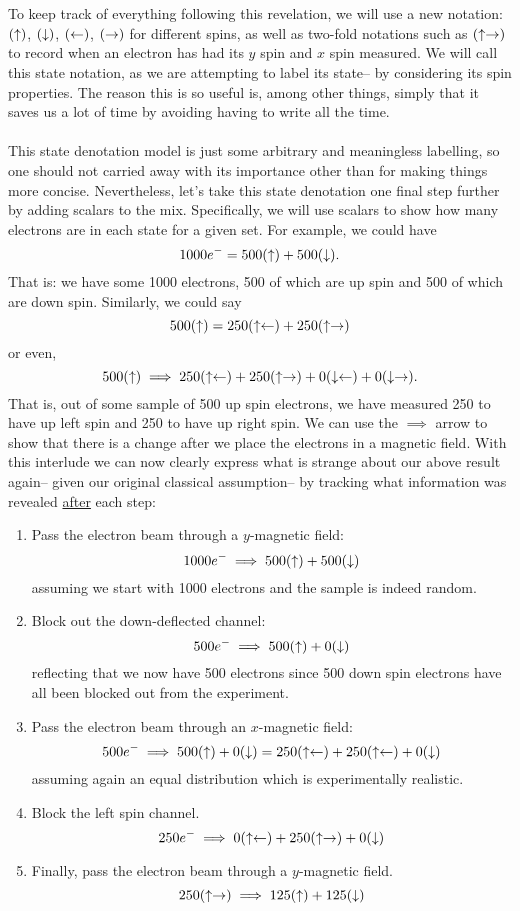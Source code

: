 \\\\
To keep track of everything following this revelation, we will use a new notation: $(\uparrow)$, $(\downarrow)$, $(\leftarrow)$, $(\rightarrow)$ for different spins, as well as two-fold notations such as $(\uparrow\rightarrow)$ to record when an electron has had its $y$ spin and $x$ spin measured. We will call this state notation,
as we are attempting to label its state-- by considering its spin properties. The reason this is so useful is, among other things, simply that it saves us a lot of time by avoiding having to write  all the time.
\\\\
This state denotation model is just some arbitrary and meaningless labelling, so one should not carried away with its importance other than for making things more concise. Nevertheless, let's take this state denotation one final step further by adding scalars to the mix. Specifically, we will use scalars to show how many electrons are in each state for a given set. For example, we could have 
$$
1000e^{-}=500(\uparrow) + 500(\downarrow).
$$
That is: we have some 1000 electrons, 500 of which are up spin and 500 of which are down spin. Similarly, we could say 
$$
500(\uparrow) = 250(\uparrow\leftarrow) + 250(\uparrow\rightarrow)
$$
or even, 
$$
500(\uparrow) \implies 250(\uparrow\leftarrow) + 250(\uparrow\rightarrow) + 0(\downarrow\leftarrow) + 0(\downarrow\rightarrow).
$$
That is, out of some sample of 500 up spin electrons, we have measured 250 to have up left spin and 250 to have up right spin. We can use the $\implies$ arrow to show that there is a change after we place the electrons in a magnetic field. With this interlude we can now clearly express what is strange about our above result again-- given our original classical assumption-- by tracking what information was revealed \underline{after} each step:
\begin{enumerate}
    \item Pass the electron beam through a $y$-magnetic field:
    $$
    1000e^{-} \implies 500(\uparrow)+500(\downarrow)
    $$
    assuming we start with 1000 electrons and the sample is indeed random.
    \item Block out the down-deflected channel:
    $$
    500e^{-} \implies 500(\uparrow)+0(\downarrow)
    $$
    reflecting that we now have 500 electrons since 500 down spin electrons have all been blocked out from the experiment.
    \item Pass the electron beam through an $x$-magnetic field:
    $$
    500e^{-} \implies500(\uparrow)+0(\downarrow)=250(\uparrow\leftarrow)+250(\uparrow\leftarrow)+0(\downarrow)
    $$
    assuming again an equal distribution which is experimentally realistic.
    \item Block the left spin channel.
    $$
    250e^{-}\implies0(\uparrow\leftarrow)+ 250(\uparrow\rightarrow) + 0(\downarrow)
    $$
    \item Finally, pass the electron beam through a $y$-magnetic field.
    $$
    250(\uparrow\rightarrow)\implies125(\uparrow)+125(\downarrow)
    $$
\end{enumerate}
